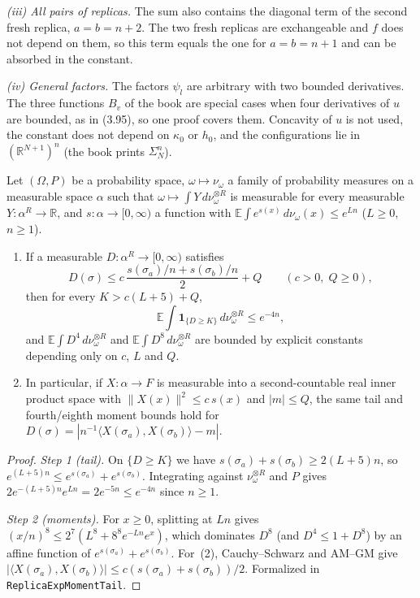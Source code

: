 \begin{remark}
\emph{(iii) All pairs of replicas.} The sum also contains the diagonal term of the second fresh replica,
$a=b=n+2$. The two fresh replicas are exchangeable and $f$ does not depend on them, so this term equals the one
for $a=b=n+1$ and can be absorbed in the constant.

\emph{(iv) General factors.} The factors $\psi_l$ are arbitrary with two bounded derivatives. The three functions
$B_v$ of the book are special cases when four derivatives of $u$ are bounded, as in (3.95), so one proof covers
them. Concavity of $u$ is not used, the constant does not depend on $\kappa_0$ or $h_0$, and the configurations lie
in $(\mathbb R^{N+1})^n$ (the book prints $\Sigma_N^n$).
\end{remark}

\begin{lemma}\label{lem:sg-tal:st-exp-tail-moments}
  \leanok
{}
Let $(\Omega,P)$ be a probability space, $\omega\mapsto\nu_\omega$ a family of probability measures on a
measurable space $\alpha$ such that $\omega\mapsto\int Y\,d\nu_\omega^{\otimes R}$ is measurable for every
measurable $Y:\alpha^R\to\mathbb R$, and $s:\alpha\to[0,\infty)$ a function with
$\mathbb E\int e^{s(x)}\,d\nu_\omega(x)\le e^{Ln}$ ($L\ge0$, $n\ge1$).
\begin{enumerate}
\item If a measurable $D:\alpha^R\to[0,\infty)$ satisfies
\[
D(\sigma)\le c\,\frac{s(\sigma_a)/n+s(\sigma_b)/n}{2}+Q \qquad (c>0,\;Q\ge0),
\]
then for every $K>c(L+5)+Q$,
\[
\mathbb E\int \mathbf 1_{\{D\ge K\}}\,d\nu_\omega^{\otimes R}\le e^{-4n},
\]
and $\mathbb E\int D^4\,d\nu_\omega^{\otimes R}$ and $\mathbb E\int D^8\,d\nu_\omega^{\otimes R}$ are bounded by
explicit constants depending only on $c$, $L$ and $Q$.
\item In particular, if $X:\alpha\to F$ is measurable into a second-countable real inner product space with
$\|X(x)\|^2\le c\,s(x)$ and $|m|\le Q$, the same tail and fourth/eighth moment bounds hold for
$D(\sigma)=|n^{-1}\langle X(\sigma_a),X(\sigma_b)\rangle-m|$.
\end{enumerate}
\end{lemma}
\begin{proof}
  \leanok
\emph{Step 1 (tail).} On $\{D\ge K\}$ we have $s(\sigma_a)+s(\sigma_b)\ge 2(L+5)n$, so
$e^{(L+5)n}\le e^{s(\sigma_a)}+e^{s(\sigma_b)}$. Integrating against $\nu_\omega^{\otimes R}$ and $P$ gives
$2e^{-(L+5)n}e^{Ln}=2e^{-5n}\le e^{-4n}$ since $n\ge1$.

\emph{Step 2 (moments).} For $x\ge0$, splitting at $Ln$ gives
$(x/n)^8\le 2^7(L^8+8^8 e^{-Ln}e^x)$, which dominates $D^8$ (and $D^4\le 1+D^8$) by an affine function of
$e^{s(\sigma_a)}+e^{s(\sigma_b)}$. For~(2), Cauchy--Schwarz and AM--GM give
$|\langle X(\sigma_a),X(\sigma_b)\rangle|\le c(s(\sigma_a)+s(\sigma_b))/2$.
Formalized in \texttt{ReplicaExpMomentTail}.
\end{proof}

